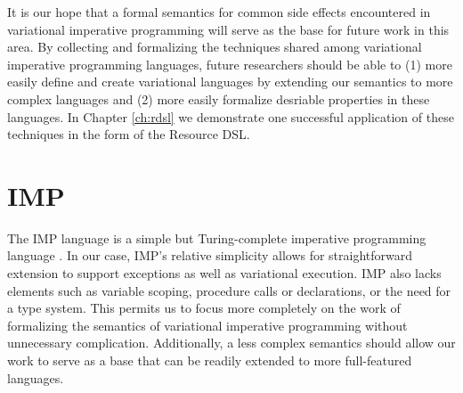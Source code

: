 \documentclass[12pt,oneside]{book}
\begin{document}
It is our hope that a formal semantics for common side effects encountered in variational imperative programming
will serve as the base for future work in this area. By collecting and formalizing the techniques shared among variational
imperative programming languages, future researchers should be able to (1) more easily define and create variational
languages by extending our semantics to more complex languages and (2) more easily formalize desriable properties in these languages.
In Chapter \ref{ch:rdsl} we demonstrate one successful application
of these techniques in the form of the Resource DSL.

\chapter{IMP}
\label{ch:imp}

The IMP language is a simple but Turing-complete imperative programming language \cite{winskel1993formal,nipkow1998winskel,nipkow2014concrete}.
In our case, IMP's relative simplicity allows for straightforward extension to support exceptions as well as variational execution. IMP also lacks elements such
as variable scoping, procedure calls or declarations, or the need for a type system. This permits us to focus more completely on the work of formalizing
the semantics of variational imperative programming without unnecessary complication. Additionally, a less complex semantics should allow our work to
serve as a base that can be readily extended to more full-featured languages.
\end{document}
